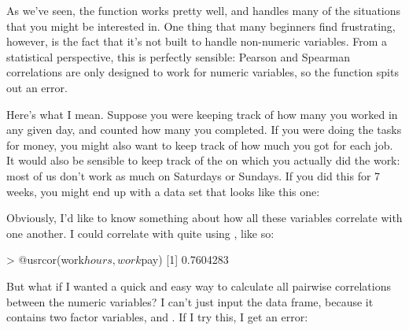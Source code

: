 
As we've seen, the  function works pretty well, and handles many of the situations that you might be interested in. One thing that many beginners find frustrating, however, is the fact that it's not built to handle non-numeric variables. From a statistical perspective, this is perfectly sensible: Pearson and Spearman correlations are only designed to work for numeric variables, so the  function spits out an error. 

Here's what I mean. Suppose you were keeping track of how many  you worked in any given day, and counted how many  you completed. If you were doing the tasks for money, you might also want to keep track of how much  you got for each job. It would also be sensible to keep track of the  on which you actually did the work: most of us don't work as much on Saturdays or Sundays. If you did this for 7 weeks, you might end up with a data set that looks like this one:
Obviously, I'd like to know something about how all these variables correlate with one another. I could correlate  with  quite using , like so:
\begin{rblock1}
> @usr{cor(work$hours,work$pay)}
[1] 0.7604283
\end{rblock1}
But what if I wanted a quick and easy way to calculate all pairwise correlations between the numeric variables? I can't just input the  data frame, because it contains two factor variables,  and . If I try this, I get an error:
